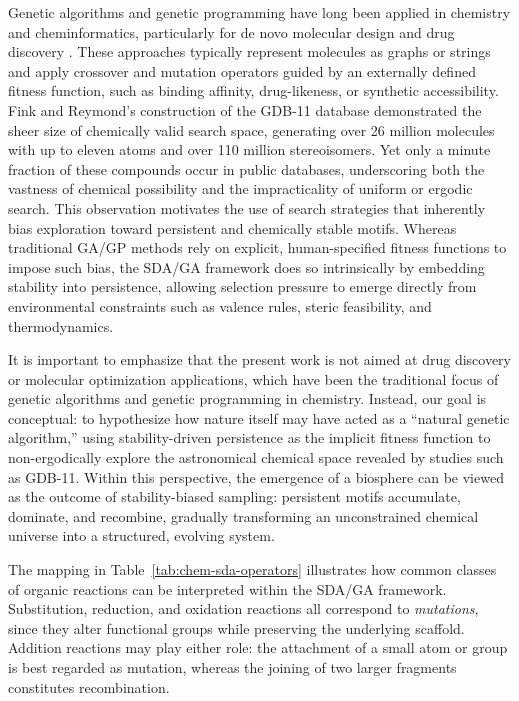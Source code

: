 \documentclass[life,article,submit,pdftex,moreauthors]{Definitions/mdpi}
\begin{document}
Genetic algorithms and genetic programming have long been applied in chemistry and 
cheminformatics, particularly for de novo molecular design and drug discovery 
\cite{brown2004ga,lewis1998gp,jensen2019ga,yoshikawa2018ga}. These approaches typically 
represent molecules as graphs or strings and apply crossover and mutation operators 
guided by an externally defined fitness function, such as binding affinity, 
drug-likeness, or synthetic accessibility. Fink and Reymond’s construction of the 
GDB-11 database \cite{fink2007gdb11} demonstrated the sheer size of chemically valid 
search space, generating over 26 million molecules with up to eleven atoms and over 
110 million stereoisomers. Yet only a minute fraction of these compounds occur in 
public databases, underscoring both the vastness of chemical possibility and the 
impracticality of uniform or ergodic search. This observation motivates the use of 
search strategies that inherently bias exploration toward persistent and chemically 
stable motifs. Whereas traditional GA/GP methods rely on explicit, human-specified 
fitness functions to impose such bias, the SDA/GA framework does so intrinsically by 
embedding stability into persistence, allowing selection pressure to emerge directly 
from environmental constraints such as valence rules, steric feasibility, and 
thermodynamics.

It is important to emphasize that the present work is not aimed at drug discovery 
or molecular optimization applications, which have been the traditional focus of 
genetic algorithms and genetic programming in chemistry. Instead, our goal is 
conceptual: to hypothesize how nature itself may have acted as a “natural genetic 
algorithm,” using stability-driven persistence as the implicit fitness function to 
non-ergodically explore the astronomical chemical space revealed by studies such 
as GDB-11. Within this perspective, the emergence of a biosphere can be viewed as 
the outcome of stability-biased sampling: persistent motifs accumulate, dominate, 
and recombine, gradually transforming an unconstrained chemical universe into a 
structured, evolving system.

The mapping in Table~\ref{tab:chem-sda-operators} illustrates how common classes of organic reactions can be interpreted within the SDA/GA framework. Substitution, reduction, and oxidation reactions all correspond to \textit{mutations}, since they alter functional groups while preserving the underlying scaffold. Addition reactions may play either role: the attachment of a small atom or group is best regarded as mutation, whereas the joining of two larger fragments constitutes recombination.  
\end{document}
